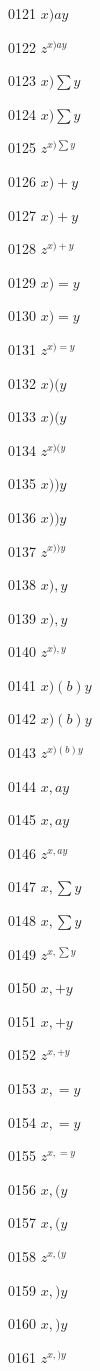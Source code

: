 \documentclass{article}
\begin{document}
0121 $x)ay$\par
0122 $z^{x)ay}$\par
0123 $\displaystyle x)\sum y$\par
0124 $x)\sum y$\par
0125 $z^{x)\sum y}$\par
0126 $\displaystyle x)+y$\par
0127 $x)+y$\par
0128 $z^{x)+y}$\par
0129 $\displaystyle x)=y$\par
0130 $x)=y$\par
0131 $z^{x)=y}$\par
0132 $\displaystyle x)(y$\par
0133 $x)(y$\par
0134 $z^{x)(y}$\par
0135 $\displaystyle x))y$\par
0136 $x))y$\par
0137 $z^{x))y}$\par
0138 $\displaystyle x),y$\par
0139 $x),y$\par
0140 $z^{x),y}$\par
0141 $\displaystyle x)\left(b\right) y$\par
0142 $x)\left(b\right) y$\par
0143 $z^{x)\left(b\right) y}$\par
0144 $\displaystyle x,ay$\par
0145 $x,ay$\par
0146 $z^{x,ay}$\par
0147 $\displaystyle x,\sum y$\par
0148 $x,\sum y$\par
0149 $z^{x,\sum y}$\par
0150 $\displaystyle x,+y$\par
0151 $x,+y$\par
0152 $z^{x,+y}$\par
0153 $\displaystyle x,=y$\par
0154 $x,=y$\par
0155 $z^{x,=y}$\par
0156 $\displaystyle x,(y$\par
0157 $x,(y$\par
0158 $z^{x,(y}$\par
0159 $\displaystyle x,)y$\par
0160 $x,)y$\par
0161 $z^{x,)y}$\par
\end{document}
